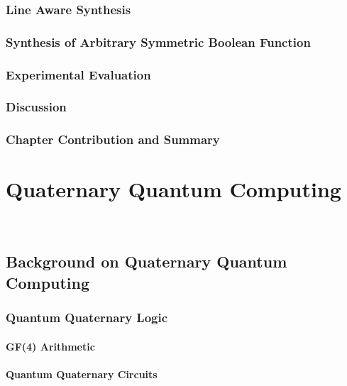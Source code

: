 \documentclass[10pt,letterpaper,twoside,openright]{book}
\begin{document}
\newpage

\section{Line Aware Synthesis}

\newpage

\section{Synthesis of Arbitrary Symmetric Boolean Function}

\newpage

\section{Experimental Evaluation}

\newpage

\section{Discussion}

\newpage

\section{Chapter Contribution and Summary}

\newpage


\part{Quaternary Quantum Computing}~\label{part:quaternary-quantum}
\chapter{Background on Quaternary Quantum Computing}

\section{Quantum Quaternary Logic}

\subsection{GF(4) Arithmetic}

\newpage

\subsection{Quantum Quaternary Circuits}
\end{document}
